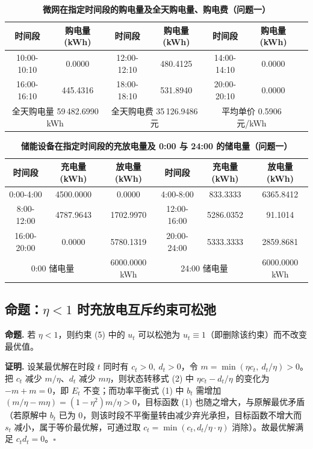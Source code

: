 \documentclass{cumcmthesis}
\begin{document}
\begin{table}[htbp]
\centering
\caption{\textbf{微网在指定时间段的购电量及全天购电量、购电费（问题一）}}
\label{tab:q1_buy}
\small
\begin{tabular}{|c|c|c|c|c|c|c|}
\hline
时间段 & 购电量(kWh) & 时间段 & 购电量(kWh) & 时间段 & 购电量(kWh) \\
\hline
10:00-10:10 & 0.0000 & 12:00-12:10 & 480.4125 & 14:00-14:10 & 0.0000 \\
\hline
16:00-16:10 & 445.4316 & 18:00-18:10 & 531.8940 & 20:00-20:10 & 0.0000 \\
\hline
\multicolumn{2}{|c|}{全天购电量 59\,482.6990 kWh} & \multicolumn{2}{c|}{全天购电费 35\,126.9486 元} & \multicolumn{2}{c|}{平均单价 0.5906 元/kWh} \\
\hline
\end{tabular}
\end{table}

\begin{table}[htbp]
\centering
\caption{\textbf{储能设备在指定时间段的充放电量及 0:00 与 24:00 的储电量（问题一）}}
\label{tab:q1_soc}
\small
\begin{tabular}{|c|c|c|c|c|c|}
\hline
时间段 & 充电量(kWh) & 放电量(kWh) & 时间段 & 充电量(kWh) & 放电量(kWh) \\
\hline
0:00-4:00   & 4500.0000 & 0.0000    & 4:00-8:00   & 833.3333  & 6365.8412 \\
\hline
8:00-12:00  & 4787.9643 & 1702.9970 & 12:00-16:00 & 5286.0352 & 91.1014 \\
\hline
16:00-20:00 & 0.0000    & 5780.1319 & 20:00-24:00 & 5333.3333 & 2859.8681 \\
\hline
\multicolumn{2}{|c|}{0:00 储电量} & 6000.0000 kWh & \multicolumn{2}{c|}{24:00 储电量} & 6000.0000 kWh \\
\hline
\end{tabular}
\end{table}

\subsection{命题：$\eta<1$ 时充放电互斥约束可松弛}
\textbf{命题.} 若 $\eta<1$，则约束 (5) 中的 $u_t$ 可以松弛为 $u_t\equiv1$（即删除该约束）而不改变最优值。

\noindent\textbf{证明.} 设某最优解在时段 $t$ 同时有 $c_t>0,\ d_t>0$，令 $m=\min(\eta c_t,\ d_t/\eta)>0$。把 $c_t$ 减少 $m/\eta$、$d_t$ 减少 $m\eta$，则状态转移式 (2) 中 $\eta c_t-d_t/\eta$ 的变化为 $-m+m=0$，即 $E_t$ 不变；而功率平衡式 (1) 中 $b_t$ 需增加 $(m/\eta-m\eta)=(1-\eta^2)m/\eta>0$，目标函数 (1) 也随之增大，与原解最优矛盾（若原解中 $b_t$ 已为 0，则该时段不平衡量转由减少弃光承担，目标函数不增大而 $s_t$ 减小，属于等价最优解，可通过取 $c_t=\min(c_t,d_t/\eta\cdot\eta)$ 消除）。故最优解满足 $c_t d_t=0$。$\square$
\end{document}
